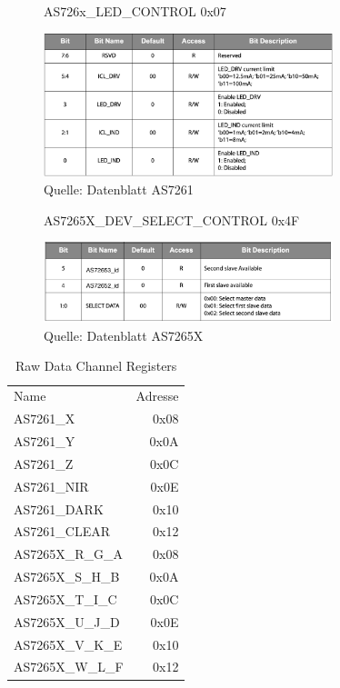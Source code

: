 \begin{figure}[H]
\centering
\caption{AS726x\_LED\_CONTROL 0x07}
\includegraphics[width=0.75\textwidth]{img/AS726x_LED_CONTROL}
\caption*{Quelle: Datenblatt AS7261}
\label{fig:AS726x_LED_CONTROL}
\end{figure}

\begin{figure}[H]
\centering
\caption{AS7265X\_DEV\_SELECT\_CONTROL 0x4F}
\includegraphics[width=0.75\textwidth]{img/AS7265X_DEV_SELECT_CONTROL}
\caption*{Quelle: Datenblatt AS7265X}
\label{fig:AS7265X_DEV_SELECT_CONTROL}
\end{figure}

\begin{table}[!ht]
\centering
\caption{Raw Data Channel Registers}
\begin{tabular}{ l r }
 Name & Adresse\\ 
AS7261\_X & 0x08\\
AS7261\_Y & 0x0A\\
AS7261\_Z & 0x0C\\
AS7261\_NIR & 0x0E\\
AS7261\_DARK & 0x10\\
AS7261\_CLEAR & 0x12\\
AS7265X\_R\_G\_A & 0x08 \\
AS7265X\_S\_H\_B & 0x0A \\
AS7265X\_T\_I\_C & 0x0C \\
AS7265X\_U\_J\_D & 0x0E \\
AS7265X\_V\_K\_E & 0x10 \\
AS7265X\_W\_L\_F & 0x12 \\
\end{tabular}
\label{fig:raw_channel_registers}
\end{table}

